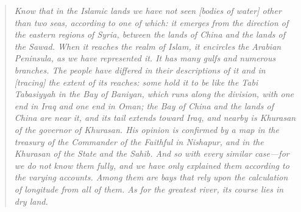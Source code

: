 \documentclass[11pt,a4paper]{article}
\begin{document}
\vspace{0.5cm}



{\small\arabicfont

}



\bigskip



\begin{quote}

\small

\textit{Know that in the Islamic lands we have not seen [bodies of water] other than two seas, according to one of which: it emerges from the direction of the eastern regions of Syria, between the lands of China and the lands of the Sawad. When it reaches the realm of Islam, it encircles the Arabian Peninsula, as we have represented it. It has many gulfs and numerous branches. The people have differed in their descriptions of it and in [tracing] the extent of its reaches: some hold it to be like the Tabi Tabasiyyah in the Bay of Baniyan, which runs along the division, with one end in Iraq and one end in Oman; the Bay of China and the lands of China are near it, and its tail extends toward Iraq, and nearby is Khurasan of the governor of Khurasan. His opinion is confirmed by a map in the treasury of the Commander of the Faithful in Nishapur, and in the Khurasan of the State and the Sahib. And so with every similar case---for we do not know them fully, and we have only explained them according to the varying accounts. Among them are bays that rely upon the calculation of longitude from all of them. As for the greatest river, its course lies in dry land.}

\end{quote}
\end{document}
